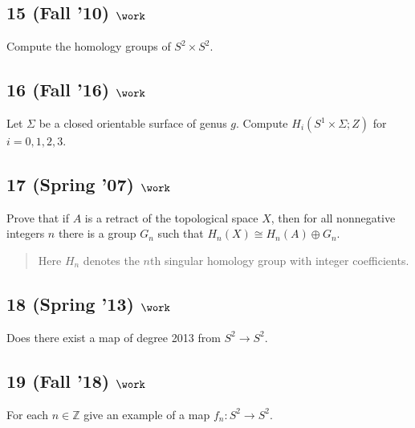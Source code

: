 \hypertarget{fall-10-work-1}{%
\subsection{\texorpdfstring{15 (Fall '10)
\(\work\)}{15 (Fall '10) \textbackslash work}}\label{fall-10-work-1}}

Compute the homology groups of \(S^2 \times S^2\).

\hypertarget{fall-16-work-5}{%
\subsection{\texorpdfstring{16 (Fall '16)
\(\work\)}{16 (Fall '16) \textbackslash work}}\label{fall-16-work-5}}

Let \(\Sigma\) be a closed orientable surface of genus \(g\). Compute
\(H_i(S^1 \times \Sigma; Z)\) for \(i = 0, 1, 2, 3\).

\hypertarget{spring-07-work-2}{%
\subsection{\texorpdfstring{17 (Spring '07)
\(\work\)}{17 (Spring '07) \textbackslash work}}\label{spring-07-work-2}}

Prove that if \(A\) is a retract of the topological space \(X\), then
for all nonnegative integers \(n\) there is a group \(G_n\) such that
\(H_{n} (X) \cong H_{n} (A) \oplus G_n\).

\begin{quote}
Here \(H_{n}\) denotes the \(n\)th singular homology group with integer
coefficients.
\end{quote}

\hypertarget{spring-13-work-3}{%
\subsection{\texorpdfstring{18 (Spring '13)
\(\work\)}{18 (Spring '13) \textbackslash work}}\label{spring-13-work-3}}

Does there exist a map of degree 2013 from \(S^2 \to S^2\).

\hypertarget{fall-18-work-5}{%
\subsection{\texorpdfstring{19 (Fall '18)
\(\work\)}{19 (Fall '18) \textbackslash work}}\label{fall-18-work-5}}

For each \(n \in {\mathbb{Z}}\) give an example of a map
\(f_n : S^2 \to S^2\).

